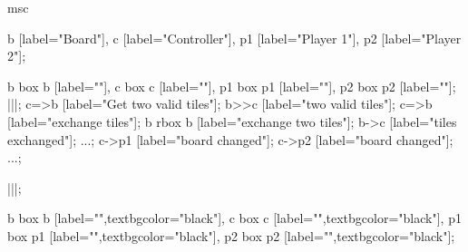 \begin{msc}
msc
{

b [label="Board"],
c [label="Controller"],
p1 [label="Player 1"],
p2 [label="Player 2"];

b box b [label=""],
c box c [label=""],
p1 box p1 [label=""],
p2 box p2 [label=""];
|||;
c=>b [label="Get two valid tiles"];
b>>c [label="two valid tiles"];
c=>b [label="exchange tiles"];
b rbox b [label="exchange two tiles"];
b->c [label="tiles exchanged"];
...;
c->p1 [label="board changed"];
c->p2 [label="board changed"];
...;

|||;

b box b [label="",textbgcolor="black"],
c box c [label="",textbgcolor="black"],
p1 box p1 [label="",textbgcolor="black"],
p2 box p2 [label="",textbgcolor="black"];

}
\end{msc}
